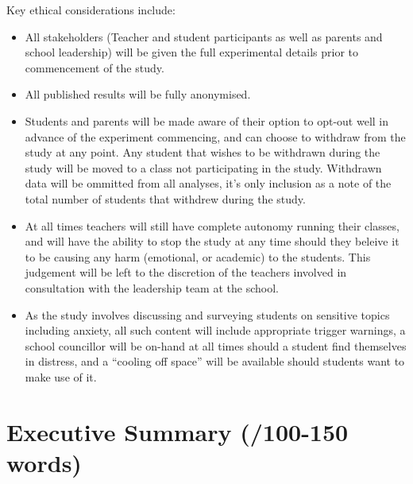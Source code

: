 \documentclass[14pt]{memoir}
\begin{document}
Key ethical considerations include:
\begin{itemize}
	\item All stakeholders (Teacher and student participants as well as parents and school leadership) will be given the full experimental details prior to commencement of the study. 
	\item All published results will be fully anonymised.
	\item Students and parents will be made aware of their option to opt-out well in advance of the experiment commencing, and can choose to withdraw from the study at any point. Any student that wishes to be withdrawn during the study will be moved to a class not participating in the study. Withdrawn data will be ommitted from all analyses, it's only inclusion as a note of the total number of students that withdrew during the study.
	\item At all times teachers will still have complete autonomy running their classes, and will have the ability to stop the study at any time should they beleive it to be causing any harm (emotional, or academic) to the students. This judgement will be left to the discretion of the teachers involved in consultation with the leadership team at the school.
	\item As the study involves discussing and surveying students on sensitive topics including anxiety, all such content will include appropriate trigger warnings, a school councillor will be on-hand at all times should a student find themselves in distress, and a ``cooling off space'' will be available should students want to make use of it.
\end{itemize}


\section{Executive Summary (/100-150 words)}



\printglossaries

\glsresetall

 
\end{document}
